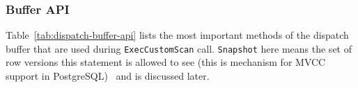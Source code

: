

\subsubsection{Buffer API}

Table~\ref{tab:dispatch-buffer-api} lists the most important methods of the dispatch buffer that are used during \texttt{ExecCustomScan} call.
\texttt{Snapshot} here means the set of row versions this statement is allowed to see (this is mechanism for MVCC support in PostgreSQL)~\parencite{postgresql17_mvcc} and is discussed later.

